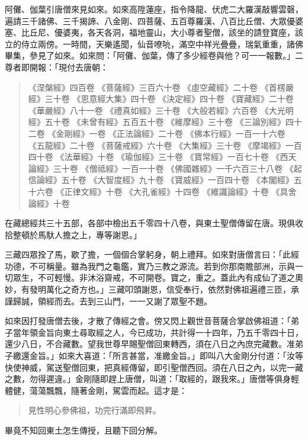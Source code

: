 阿儺、伽葉引唐僧來見如來。如來高陞蓮座，指令降龍、伏虎二大羅漢敲響雲磬，遍請三千諸佛、三千揭諦、八金剛、四菩薩、五百尊羅漢、八百比丘僧、大眾優婆塞、比丘尼、優婆夷，各天各洞，福地靈山，大小尊者聖僧，該坐的請登寶座，該立的侍立兩傍。一時間，天樂遙聞，仙音嘹喨，滿空中祥光疊疊，瑞氣重重，諸佛畢集，參見了如來。如來問：「阿儺、伽葉，傳了多少經卷與他？可一一報數。」二尊者即開報：「現付去唐朝：
\begin{quote}
《涅槃經》四百卷
《菩薩經》三百六十卷
《虛空藏經》二十卷
《首楞嚴經》三十卷
《恩意經大集》四十卷
《決定經》四十卷
《寶藏經》二十卷
《華嚴經》八十一卷
《禮真如經》三十卷
《大般若經》六百卷
《大光明經》五十卷
《未曾有經》五百五十卷
《維摩經》三十卷
《三論別經》四十二卷
《金剛經》一卷
《正法論經》二十卷
《佛本行經》一百一十六卷
《五龍經》二十卷
《菩薩戒經》六十卷
《大集經》三十卷
《摩竭經》一百四十卷
《法華經》十卷
《瑜伽經》三十卷
《寶常經》一百七十卷
《西天論經》三十卷
《僧祗經》一百一十卷
《佛國雜經》一千六百三十八卷
《起信論經》五十卷
《大智度經》九十卷
《寶威經》一百四十卷
《本閣經》五十六卷
《正律文經》十卷
《大孔雀經》十四卷
《維識論經》十卷
《具舍論經》十卷
\end{quote}

在藏總經共三十五部，各部中檢出五千零四十八卷，與東土聖僧傳留在唐。現俱收拾整頓於馬馱人擔之上，專等謝恩。」

三藏四眾拴了馬，歇了擔，一個個合掌躬身，朝上禮拜。如來對唐僧言曰：「此經功德，不可稱量。雖為我門之龜鑑，實乃三教之源流。若到你那南贍部洲，示與一切眾生，不可輕慢。非沐浴齋戒，不可開卷。寶之，重之。蓋此內有成仙了道之奧妙，有發明萬化之奇方也。」三藏叩頭謝恩，信受奉行，依然對佛祖遍禮三匝，承謹歸誠，領經而去。去到三山門，一一又謝了眾聖不題。

如來因打發唐僧去後，才散了傳經之會。傍又閃上觀世音菩薩合掌啟佛祖道：「弟子當年領金旨向東土尋取經之人，今已成功，共計得一十四年，乃五千零四十日，還少八日，不合藏數。望我世尊早賜聖僧回東轉西，須在八日之內庶完藏數。准弟子繳還金旨。」如來大喜道：「所言甚當，准繳金旨。」即叫八大金剛分付道：「汝等快使神威，駕送聖僧回東，把真經傳留，即引聖僧西回。須在八日之內，以完一藏之數，勿得遲違。」金剛隨即趕上唐僧，叫道：「取經的，跟我來。」唐僧等俱身輕體健，蕩蕩飄飄，隨著金剛，駕雲而起。這才是：
\begin{quote}
見性明心參佛祖，功完行滿即飛昇。
\end{quote}

畢竟不知回東土怎生傳授，且聽下回分解。

